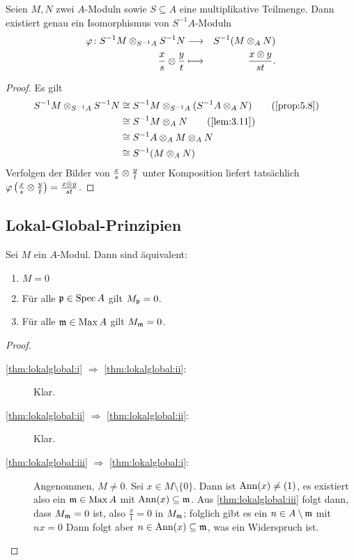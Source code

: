 \documentclass[12pt,a4paper]{scrartcl}
\theoremstyle{cplain}
\theoremstyle{cdef}
\begin{document}
\begin{satz}
	Seien $M,N$ zwei $A$-Moduln sowie $S\subseteq A$ eine multiplikative Teilmenge. Dann existiert genau ein Isomorphismus von $S^{-1}A$-Moduln
	\begin{eqnarray*}
		\varphi\colon S^{-1}M\otimes_{S^{-1}A}S^{-1}N &\longrightarrow& S^{-1}(M\otimes_AN) \\
		\frac xs\otimes \frac yt &\longmapsto& \frac{x\otimes y}{st}.
	\end{eqnarray*}
\end{satz}
\begin{proof}
	Es gilt
	\begin{align*}
		S^{-1}M\tp_{S^{-1}A}S^{-1}N &\cong S^{-1}M \tp_{S^{-1}A}(S^{-1}A\tp_AN) \tag{\cref{prop:5.8}} \\
		&\cong S^{-1}M\tp_A N \tag{\cref{lem:3.11}} \\
		&\cong S^{-1}A\tp_AM\tp_AN& \\ 
		&\cong S^{-1}(M\tp_AN)&
	\end{align*}
	Verfolgen der Bilder von $\frac xs\otimes \frac yt$ unter Komposition liefert tatsächlich $\varphi\left(\frac xs\otimes \frac yt\right) = \frac{x\otimes y}{st}$.
\end{proof}

\subsection{Lokal-Global-Prinzipien}
\begin{satz} \label{thm:lokalglobal}
	Sei $M$ ein $A$-Modul. Dann sind äquivalent:
	\begin{enumerate}
		\item $M = 0$ \label{thm:lokalglobal:i}
		\item Für alle $\mathfrak{p}\in \operatorname{Spec} A$ gilt $M_{\mathfrak{p}} = 0$. \label{thm:lokalglobal:ii}
		\item Für alle $\mathfrak{m}\in\operatorname{Max} A$ gilt $M_{\mathfrak{m}} = 0$. \label{thm:lokalglobal:iii}
	\end{enumerate}
\end{satz}
\begin{proof}
	\leavevmode
	\begin{description}
		\item[\ref{thm:lokalglobal:i} $\Rightarrow$ \ref{thm:lokalglobal:ii}:] Klar.
		\item[\ref{thm:lokalglobal:ii} $\Rightarrow$ \ref{thm:lokalglobal:ii}:] Klar.
		\item[\ref{thm:lokalglobal:iii} $\Rightarrow$ \ref{thm:lokalglobal:i}:] Angenommen, $M \neq 0$. Sei $x\in M\setminus \{0\}$. Dann ist $\operatorname{Ann}(x) \neq (1)$, es existiert also ein $\mathfrak{m}\in \operatorname{Max} A$ mit $\operatorname{Ann}(x)\subseteq \mathfrak{m}$. Aus \ref{thm:lokalglobal:iii} folgt dann, dass $M_{\mathfrak{m}} = 0$ ist, also $\frac x1 = 0$ in $M_{\mathfrak{m}}$; folglich gibt es ein $n\in A\setminus \mathfrak{m}$ mit $ nx = 0$ Dann folgt aber $n\in \operatorname{Ann}(x)\subseteq \mathfrak{m}$, was ein Widerspruch ist.
		\qedhere
	\end{description}
\end{proof}
\end{document}
